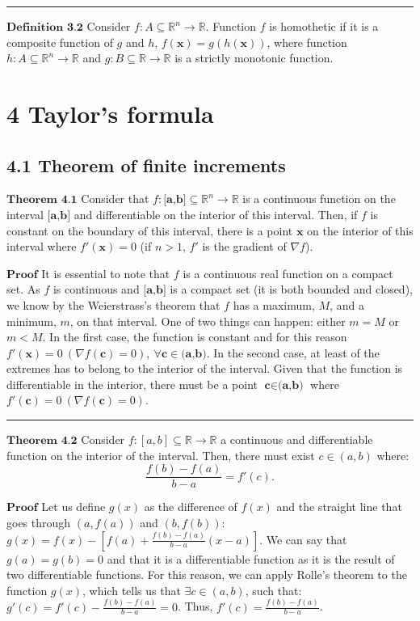 \documentclass[0pt, a4paper]{article}
\begin{document}
\noindent\rule{\textwidth}{1pt}

$\textbf{Definition 3.2}$ Consider $f:A\subseteq\mathbb{R}^n\to\mathbb{R}$. Function $f$ is homothetic if it is a composite function of $g$ and $h$, $f(\textbf{x})=g(h(\textbf{x}))$, where function $h:A\subseteq\mathbb{R}^n\to\mathbb{R}$ and $g:B\subseteq\mathbb{R}\to\mathbb{R}$ is a strictly monotonic function.

\clearpage

\section*{4 Taylor's formula}
\subsection*{4.1 Theorem of finite increments}


$\textbf{Theorem 4.1}$ Consider that  $f:\textbf{[a,b]}\subseteq\mathbb{R}^n\to\mathbb{R}$ is a continuous function on the interval $\textbf{[a,b]}$ and differentiable on the interior of this interval. Then, if $f$ is constant on the boundary of this interval, there is a point $\textbf{x}$ on the interior of this interval where $f'(\textbf{x})=0$ (if $n>1$, $f'$ is the gradient of $\nabla f$).

$\textbf{Proof}$ It is essential to note that $f$ is a continuous real function on a compact set. As $f$ is continuous and $\textbf{[a,b]}$ is a compact set (it is both bounded and closed), we know by the Weierstrass's theorem that $f$ has a maximum, $M$, and a minimum, $m$, on that interval. One of two things can happen: either $m=M$ or $m<M$. In the first case, the function is constant and for this reason $f'(\textbf{x})=0\ (\nabla f(\textbf{c})=0),\ \forall \textbf{c}\in\textbf{(a,b)}$. In the second case, at least of the extremes has to belong to the interior of the interval. Given that the function is differentiable in the interior, there must be a point $\textbf{c}\in\textbf{(a,b)}$ where $f'(\textbf{c})=0\ (\nabla f(\textbf{c})=0)$.
\noindent\rule{\textwidth}{1pt}

$\textbf{Theorem 4.2}$ Consider $f:[a,b]\subseteq\mathbb{R}\to\mathbb{R}$ a continuous and differentiable function on the interior of the interval. Then, there must exist $c\in(a,b)$ where:
$$\frac{f(b)-f(a)}{b-a}=f'(c).$$

$\textbf{Proof}$ Let us define $g(x)$ as the difference of $f(x)$ and the straight line that goes through $(a,f(a))$ and $ (b,f(b))  $: $g(x)=f(x)-\left[f(a)+\frac{f(b)-f(a)}{b-a}(x-a)\right]$. We can say that $g(a)=g(b)=0$ and that it is a differentiable function as it is the result of two differentiable functions. For this reason, we can apply Rolle's theorem to the function $g(x)$, which tells us that $\exists c\in(a,b)$, such that: $g'(c)=f'(c)-\frac{f(b)-f(a)}{b-a}=0$. Thus, $f'(c)=\frac{f(b)-f(a)}{b-a}$.
\end{document}
